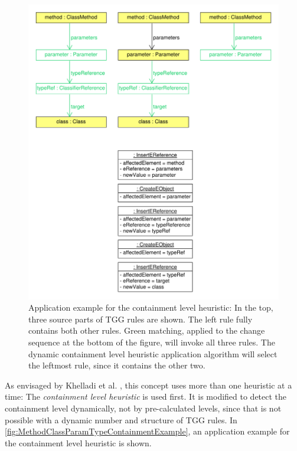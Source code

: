 \begin{figure}
\centering
\includegraphics[width=15.8cm]{figures/tggRule_methodClassParamType_containmentExample.pdf}
\caption[Application example for the containment level heuristic]{Application example for the containment level heuristic: In the top, three source parts of TGG rules are shown. The left rule fully contains both other rules. Green matching, applied to the change sequence at the bottom of the figure, will invoke all three rules.
The dynamic containment level heuristic application algorithm will select the leftmost rule, since it contains the other two.}
\label{fig:MethodClassParamTypeContainmentExample}
\end{figure}

As envisaged by Khelladi et al. \cite{khelladi_detecting_complex_changes_2015}, this concept uses more than one heuristic at a time:
The \emph{containment level heuristic} is used first. It is modified to detect the containment level dynamically, not by pre-calculated levels, since that is not possible with a dynamic number and structure of TGG rules. In \autoref{fig:MethodClassParamTypeContainmentExample}, an application example for the containment level heuristic is shown.

